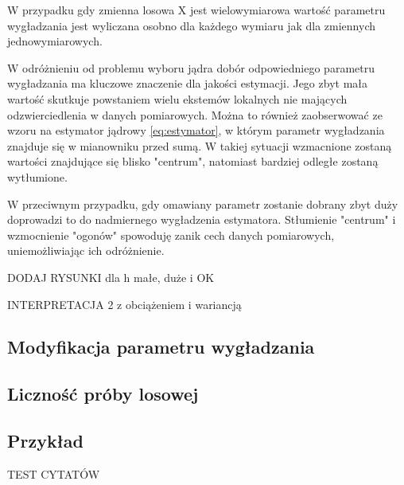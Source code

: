 W przypadku gdy zmienna losowa X jest wielowymiarowa wartość parametru wygładzania jest wyliczana osobno dla każdego wymiaru jak dla zmiennych jednowymiarowych. 

W odróżnieniu od problemu wyboru jądra dobór odpowiedniego parametru wygładzania ma kluczowe znaczenie dla jakości estymacji. Jego zbyt mała wartość skutkuje powstaniem wielu ekstemów lokalnych nie mających odzwierciedlenia w danych pomiarowych. Można to również zaobserwować ze wzoru na estymator jądrowy \ref{eq:estymator}, w którym parametr wygładzania znajduje się w mianowniku przed sumą. W takiej sytuacji wzmacnione zostaną wartości znajdujące się blisko "centrum", natomiast bardziej odległe zostaną wytłumione.

W przeciwnym przypadku, gdy omawiany parametr zostanie dobrany zbyt duży doprowadzi to do nadmiernego wygładzenia estymatora. Stłumienie "centrum" i wzmocnienie "ogonów" spowoduję zanik cech danych pomiarowych, uniemożliwiając ich odróżnienie.

DODAJ RYSUNKI dla h małe, duże i OK

INTERPRETACJA 2 z obciążeniem i wariancją





\subsection{Modyfikacja parametru wygładzania}
\label{subsec:modyfikacje_h}

\subsection{Liczność próby losowej}

\subsection{Przykład}



TEST CYTATÓW
\cite{Kul10}
\cite{Kul05}
\cite{Kul12}
